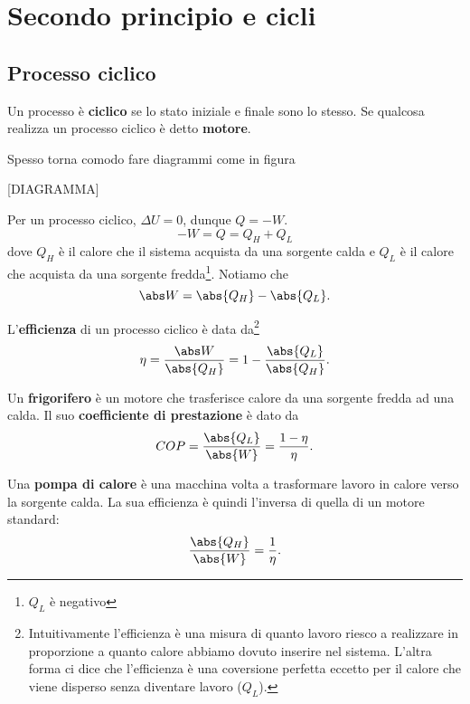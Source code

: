 \chapter{Secondo principio e cicli}

\section{Processo ciclico}
\begin{definition}
Un processo \`e \textbf{ciclico} se lo stato iniziale e finale sono lo stesso. Se qualcosa realizza un processo ciclico \`e detto \textbf{motore}.
\end{definition}

\begin{remark}
Spesso torna comodo fare diagrammi come in figura

[DIAGRAMMA]
\end{remark}

\begin{remark}
Per un processo ciclico, $\Delta U=0$, dunque $Q=-W$.
\[-W=Q=Q_H+Q_L\]
dove $Q_H$ \`e il calore che il sistema acquista da una sorgente calda e $Q_L$ \`e il calore che acquista da una sorgente fredda\footnote{$Q_L$ \`e negativo}. Notiamo che
\[\abs W=\abs{Q_H}-\abs{Q_L}.\]
\end{remark}

\begin{definition}[Efficienza]
L'\textbf{efficienza} di un processo ciclico \`e data da\footnote{Intuitivamente l'efficienza \`e una misura di quanto lavoro riesco a realizzare in proporzione a quanto calore abbiamo dovuto inserire nel sistema. L'altra forma ci dice che l'efficienza \`e una coversione perfetta eccetto per il calore che viene disperso senza diventare lavoro ($Q_L$).}
\[\eta=\frac{\abs W}{\abs{Q_H}}=1-\frac{\abs{Q_L}}{\abs{Q_H}}.\]
\end{definition}

\begin{definition}
Un \textbf{frigorifero} \`e un motore che trasferisce calore da una sorgente fredda ad una calda. Il suo \textbf{coefficiente di prestazione} \`e dato da
\[COP=\frac{\abs{Q_L}}{\abs{W}}=\frac{1-\eta}\eta.\]
\end{definition}

\begin{definition}
Una \textbf{pompa di calore} \`e una macchina volta a trasformare lavoro in calore verso la sorgente calda. La sua efficienza \`e quindi l'inversa di quella di un motore standard:
\[\frac{\abs{Q_H}}{\abs{W}}=\frac1\eta.\]
\end{definition}


